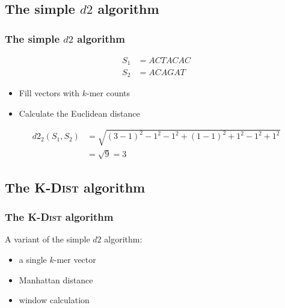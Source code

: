 \documentclass{beamer}
\begin{document}
\subsection{The simple $d2$ algorithm}

\begin{frame}
  \frametitle{The simple $d2$ algorithm}

  \begin{align*}
    S_1 &= ACTACAC \\
    S_2 &= ACAGAT
  \end{align*}

  \begin{itemize}
    \item Fill vectors with $k$-mer counts
  \end{itemize}
  \begin{table}[h]
    \centering
  \end{table}

  \begin{itemize}
    \item Calculate the Euclidean distance
  \end{itemize}
  \begin{align*}
    d2_2(S_1, S_2)
      &= \sqrt{(3-1)^2 - 1^2 - 1^2 + (1-1)^2 + 1^2 - 1^2 + 1^2} \\
      &= \sqrt{9} = 3
  \end{align*}
\end{frame}

\subsection{The \textsc{K-Dist} algorithm}

\begin{frame}
  \frametitle{The \textsc{K-Dist} algorithm}

  A variant of the simple $d2$ algorithm:

  \begin{itemize}
    \item a single $k$-mer vector
    \item Manhattan distance
    \item window calculation
  \end{itemize}
\end{frame}
\end{document}
